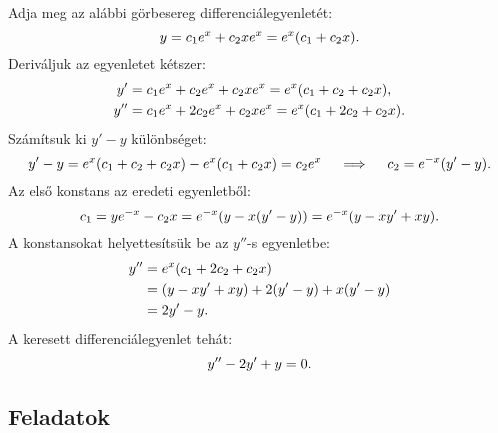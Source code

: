 \documentclass{szb-practice}
\begin{document}
\begin{example}
  Adja meg az alábbi görbesereg differenciálegyenletét:
  $$
    y = c_1 e^x + c_2 x e^{x} = e^x (c_1 + c_2 x)
    \text.
  $$
  Deriváljuk az egyenletet kétszer:
  \begin{align*}
    y'  & = c_1 e^x + c_2 e^x + c_2 x e^x = e^x (c_1 + c_2 + c_2 x) \text,     \\
    y'' & = c_1 e^x + 2 c_2 e^x + c_2 x e^x = e^x (c_1 + 2 c_2 + c_2 x) \text.
  \end{align*}
  Számítsuk ki $y' - y$ különbséget:
  $$
    y' - y
    = e^x (c_1 + c_2 + c_2 x) - e^x (c_1 + c_2 x)
    = c_2 e^x
    \quad \implies \quad
    c_2 = e^{-x} (y' - y)
    \text.
  $$
  Az első konstans az eredeti egyenletből:
  $$
    c_1
    = ye^{-x} - c_2x
    = e^{-x}(y - x(y' - y))
    = e^{-x} (y - xy' + xy)
    \text.
  $$
  A konstansokat helyettesítsük be az $y''$-s egyenletbe:
  \begin{align*}
    y''
     & = e^x (c_1 + 2 c_2 + c_2 x)              \\
     & = (y - xy' + xy) + 2(y' - y) + x(y' - y) \\
     & = 2y' - y
    \text.
  \end{align*}
  A keresett differenciálegyenlet tehát:
  $$
    y'' - 2y' + y = 0
    \text.
  $$
\end{example}

\clearpage
\subsection{Feladatok}
\end{document}
